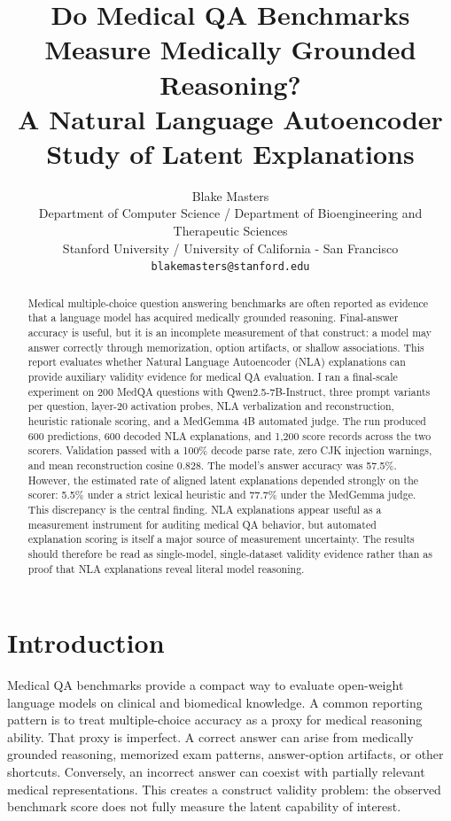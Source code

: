 \documentclass{article}
\title{Do Medical QA Benchmarks Measure Medically Grounded Reasoning? \\
A Natural Language Autoencoder Study of Latent Explanations}
\author{%
  Blake Masters \\
  Department of Computer Science / Department of Bioengineering and Therapeutic Sciences\\
  Stanford University / University of California - San Francisco\\
  \texttt{blakemasters@stanford.edu} \\
}
\begin{document}
\maketitle

\begin{abstract}
Medical multiple-choice question answering benchmarks are often reported as evidence that a language model has acquired medically grounded reasoning. Final-answer accuracy is useful, but it is an incomplete measurement of that construct: a model may answer correctly through memorization, option artifacts, or shallow associations. This report evaluates whether Natural Language Autoencoder (NLA) explanations can provide auxiliary validity evidence for medical QA evaluation. I ran a final-scale experiment on 200 MedQA questions with Qwen2.5-7B-Instruct, three prompt variants per question, layer-20 activation probes, NLA verbalization and reconstruction, heuristic rationale scoring, and a MedGemma 4B automated judge. The run produced 600 predictions, 600 decoded NLA explanations, and 1,200 score records across the two scorers. Validation passed with a 100\% decode parse rate, zero CJK injection warnings, and mean reconstruction cosine 0.828. The model's answer accuracy was 57.5\%. However, the estimated rate of aligned latent explanations depended strongly on the scorer: 5.5\% under a strict lexical heuristic and 77.7\% under the MedGemma judge. This discrepancy is the central finding. NLA explanations appear useful as a measurement instrument for auditing medical QA behavior, but automated explanation scoring is itself a major source of measurement uncertainty. The results should therefore be read as single-model, single-dataset validity evidence rather than as proof that NLA explanations reveal literal model reasoning.
\end{abstract}

\section{Introduction}

Medical QA benchmarks provide a compact way to evaluate open-weight language models on clinical and biomedical knowledge. A common reporting pattern is to treat multiple-choice accuracy as a proxy for medical reasoning ability. That proxy is imperfect. A correct answer can arise from medically grounded reasoning, memorized exam patterns, answer-option artifacts, or other shortcuts. Conversely, an incorrect answer can coexist with partially relevant medical representations. This creates a construct validity problem: the observed benchmark score does not fully measure the latent capability of interest.
\end{document}
